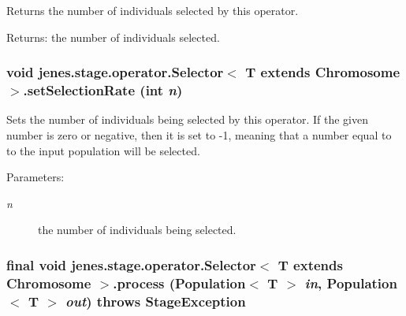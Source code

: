 Returns the number of individuals selected by this operator.

\begin{Desc}
\item[Returns:]the number of individuals selected. \end{Desc}
\hypertarget{classjenes_1_1stage_1_1operator_1_1_selector_3_01_t_01extends_01_chromosome_01_4_a67094343d09f80b0ce35d0f20a517d5}{
\subsubsection[setSelectionRate]{\setlength{\rightskip}{0pt plus 5cm}void jenes.stage.operator.Selector$<$ T extends Chromosome $>$.setSelectionRate (int {\em n})}}
\label{classjenes_1_1stage_1_1operator_1_1_selector_3_01_t_01extends_01_chromosome_01_4_a67094343d09f80b0ce35d0f20a517d5}


Sets the number of individuals being selected by this operator. If the given number is zero or negative, then it is set to -1, meaning that a number equal to to the input population will be selected.

\begin{Desc}
\item[Parameters:]
\begin{description}
\item[{\em n}]the number of individuals being selected. \end{description}
\end{Desc}
\hypertarget{classjenes_1_1stage_1_1operator_1_1_selector_3_01_t_01extends_01_chromosome_01_4_11275bed8b009ece669a5c88c6e10b55}{
\subsubsection[process]{\setlength{\rightskip}{0pt plus 5cm}final void jenes.stage.operator.Selector$<$ T extends Chromosome $>$.process (Population$<$ T $>$ {\em in}, \/  Population$<$ T $>$ {\em out})  throws {\bf StageException} }}
\label{classjenes_1_1stage_1_1operator_1_1_selector_3_01_t_01extends_01_chromosome_01_4_11275bed8b009ece669a5c88c6e10b55}


